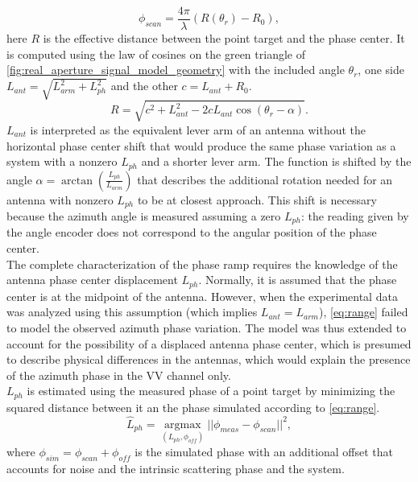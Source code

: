 \begin{equation}\label{eq:range_phase}
	\phi_{scan} = \frac{4 \pi}{\lambda}\left(R\left(\theta_r\right) - R_0\right),
\end{equation}
here $R$ is the effective distance between the point target and the phase center.
It is computed using the law of cosines on the green triangle of \autoref{fig:real_aperture_signal_model_geometry} with the included angle $\theta_r$, one  side $L_{ant} = \sqrt{L_{arm}^2 + L_{ph}^2}$ and the other $c = L_{ant} + R_0$.
\begin{equation}\label{eq:range}
	R = \sqrt{ c^2 +  L_{ant}^2 - 2 c L_{ant} \cos{\left(\theta_r - \alpha\right)}}.
\end{equation}
$L_{ant}$ is interpreted as the equivalent lever arm of an antenna without the horizontal phase center shift that would produce the same phase variation as a system with a nonzero $L_{ph}$ and a shorter lever arm.
The function is shifted by the angle  $\alpha = \operatorname{\arctan}\left({\frac{L_{ph}}{L_{arm}}}\right)$ that describes the additional rotation needed for an antenna with nonzero $L_{ph}$ to be at closest approach. This shift is necessary because the azimuth angle is measured assuming a zero $L_{ph}$: the reading given by the angle encoder does not correspond to the angular position of the phase center.\\
The complete characterization of the phase ramp requires the knowledge of the antenna phase center displacement $L_{ph}$. Normally, it is assumed that the phase center is at the midpoint of the antenna. However, when the experimental data was analyzed using this assumption (which implies $L_{ant} = L_{arm}$),  \eqref{eq:range} failed to model the observed azimuth phase variation. The model was thus extended to account for the possibility of a displaced antenna phase center, which is presumed to describe physical differences in the antennas, which would explain the presence of the azimuth phase in the VV channel only.\\ $L_{ph}$ is estimated using the measured phase of a point target by minimizing the squared distance between it an the phase simulated according to \eqref{eq:range}.
\begin{equation}\label{eq:rph_estimation}
	\hat{L}_{ph} = \underset{\left(L_{ph}, \phi_{off}\right)}{\operatorname{argmax}}{\vert\vert\phi_{meas} - \phi_{scan}\vert\vert}^2,
\end{equation}
where $\phi_{sim} = \phi_{scan} + \phi_{off}$ is the simulated phase with an additional offset that accounts for noise and the intrinsic scattering phase and the system.\\
